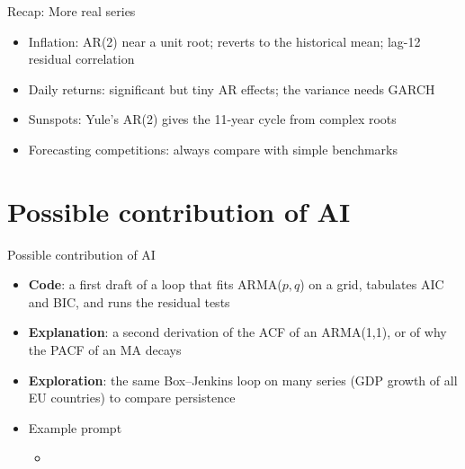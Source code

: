 \begin{frame}{Recap: More real series}
\itemsize{\small}
\begin{itemize}
    \item Inflation: AR(2) near a unit root; reverts to the historical mean; lag-12 residual correlation
    \item Daily returns: significant but tiny AR effects; the variance needs GARCH
    \item Sunspots: Yule's AR(2) gives the 11-year cycle from complex roots
    \item Forecasting competitions: always compare with simple benchmarks
\end{itemize}
\end{frame}


\section{Possible contribution of AI}

\begin{frame}{Possible contribution of AI}
\itemsize{\small}
\begin{itemize}
    \item \textbf{Code}: a first draft of a loop that fits ARMA($p,q$) on a grid, tabulates AIC and BIC, and runs the residual tests
    \item \textbf{Explanation}: a second derivation of the ACF of an ARMA(1,1), or of why the PACF of an MA decays
    \item \textbf{Exploration}: the same Box--Jenkins loop on many series (GDP growth of all EU countries) to compare persistence
    \item Example prompt
    \begin{itemize}
        \item {}
    \end{itemize}
\end{itemize}
\end{frame}

